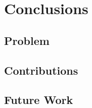 
%

\chapter{Conclusions}\label{cha:conclusions}
\section{Problem}\label{sub:summary}
\section{Contributions}\label{sub:summary}
\section{Future Work}\label{sub:summary}

